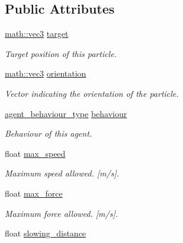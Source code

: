 \subsection*{Public Attributes}
\begin{DoxyCompactItemize}
\item 
\hyperlink{structphysim_1_1math_1_1vec3}{math\+::vec3} \hyperlink{classphysim_1_1particles_1_1agent__particle_a0658207e11a5d39844856233ae8bf2cb}{target}
\begin{DoxyCompactList}\small\item\em Target position of this particle. \end{DoxyCompactList}\item 
\hyperlink{structphysim_1_1math_1_1vec3}{math\+::vec3} \hyperlink{classphysim_1_1particles_1_1agent__particle_a87b2554699454e6850f1d2b48e278f63}{orientation}
\begin{DoxyCompactList}\small\item\em Vector indicating the orientation of the particle. \end{DoxyCompactList}\item 
\mbox{\label{classphysim_1_1particles_1_1agent__particle_af219e3f46630bb7f51f3d00952ed4f1c}} 
\hyperlink{namespacephysim_1_1particles_a033757595f7862a0fc8a389d79bf9c88}{agent\+\_\+behaviour\+\_\+type} \hyperlink{classphysim_1_1particles_1_1agent__particle_af219e3f46630bb7f51f3d00952ed4f1c}{behaviour}
\begin{DoxyCompactList}\small\item\em Behaviour of this agent. \end{DoxyCompactList}\item 
float \hyperlink{classphysim_1_1particles_1_1agent__particle_a3e34a9a7fc82cbad0226b7b925b5ba22}{max\+\_\+speed}
\begin{DoxyCompactList}\small\item\em Maximum speed allowed. \mbox{[}m/s\mbox{]}. \end{DoxyCompactList}\item 
float \hyperlink{classphysim_1_1particles_1_1agent__particle_a57909cb85564f4432754000ed570d88a}{max\+\_\+force}
\begin{DoxyCompactList}\small\item\em Maximum force allowed. \mbox{[}m/s\mbox{]}. \end{DoxyCompactList}\item 
float \hyperlink{classphysim_1_1particles_1_1agent__particle_a1c3e4357a84047b45ea827a2e90cd14b}{slowing\+\_\+distance}

\end{DoxyCompactItemize}

